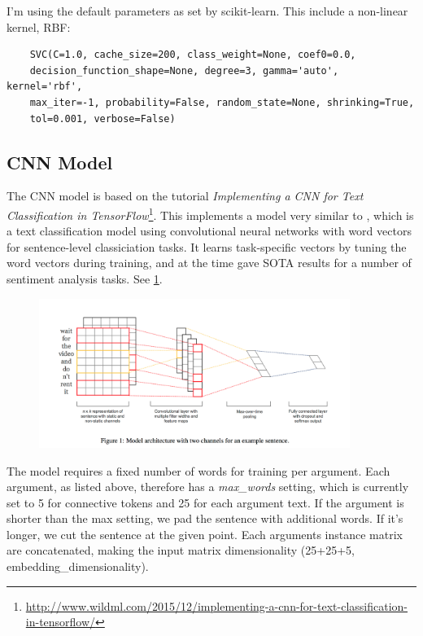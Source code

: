 I'm using the default parameters as set by scikit-learn. This include a non-linear kernel, RBF:

\begin{verbatim}
	SVC(C=1.0, cache_size=200, class_weight=None, coef0=0.0,
    decision_function_shape=None, degree=3, gamma='auto', kernel='rbf',
    max_iter=-1, probability=False, random_state=None, shrinking=True,
    tol=0.001, verbose=False)
\end{verbatim}

\subsection{CNN Model}

The CNN model is based on the tutorial \emph{Implementing a CNN for Text Classification in TensorFlow}\footnote{\url{http://www.wildml.com/2015/12/implementing-a-cnn-for-text-classification-in-tensorflow/}}. This implements a model very similar to \cite{kim_convolutional_2014}, which is a text classification model using convolutional neural networks with word vectors for sentence-level classiciation tasks. It learns task-specific vectors by tuning the word vectors during training, and at the time gave SOTA results for a number of sentiment analysis tasks. See \ref{fig:cnnarchitecture}.

\begin{figure}[h]
	\includegraphics[width=0.9\textwidth]{images/cnn_architecture}
	\label{fig:cnnarchitecture}
\end{figure}

The model requires a fixed number of words for training per argument. Each argument, as listed above, therefore has a \emph{max\_words} setting, which is currently set to 5 for connective tokens and 25 for each argument text. If the argument is shorter than the max setting, we pad the sentence with additional words. If it's longer, we cut the sentence at the given point. Each arguments instance matrix are concatenated, making the input matrix dimensionality (25+25+5, embedding\_dimensionality).

